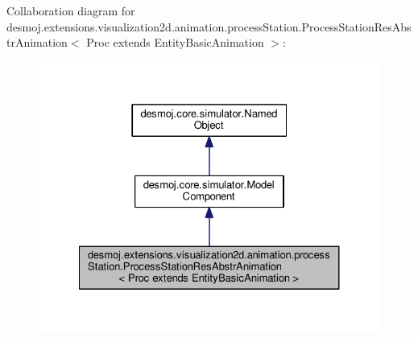 Collaboration diagram for desmoj.\-extensions.\-visualization2d.\-animation.\-process\-Station.\-Process\-Station\-Res\-Abstr\-Animation$<$ Proc extends Entity\-Basic\-Animation $>$\-:
\nopagebreak
\begin{figure}[H]
\begin{center}
\leavevmode
\includegraphics[width=326pt]{classdesmoj_1_1extensions_1_1visualization2d_1_1animation_1_1process_station_1_1_process_station666330122641f2114121ffb8bbd07bea}
\end{center}
\end{figure}
